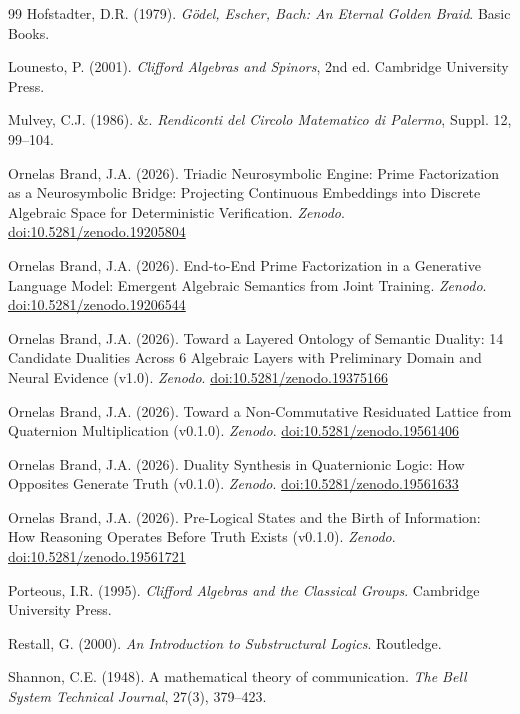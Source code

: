 \documentclass[11pt,a4paper]{article}
\begin{document}
\begin{thebibliography}{99}
Hofstadter, D.R. (1979).
\textit{G\"odel, Escher, Bach: An Eternal Golden Braid}.
Basic Books.

Lounesto, P. (2001).
\textit{Clifford Algebras and Spinors}, 2nd ed.
Cambridge University Press.

Mulvey, C.J. (1986).
\&.
\textit{Rendiconti del Circolo Matematico di Palermo}, Suppl. 12,
99--104.

Ornelas Brand, J.A. (2026).
Triadic Neurosymbolic Engine: Prime Factorization as a Neurosymbolic
Bridge: Projecting Continuous Embeddings into Discrete Algebraic Space
for Deterministic Verification.
\textit{Zenodo}.
\href{https://doi.org/10.5281/zenodo.19205804}{doi:10.5281/zenodo.19205804}

Ornelas Brand, J.A. (2026).
End-to-End Prime Factorization in a Generative Language Model:
Emergent Algebraic Semantics from Joint Training.
\textit{Zenodo}.
\href{https://doi.org/10.5281/zenodo.19206544}{doi:10.5281/zenodo.19206544}

Ornelas Brand, J.A. (2026).
Toward a Layered Ontology of Semantic Duality: 14 Candidate Dualities
Across 6 Algebraic Layers with Preliminary Domain and Neural Evidence
(v1.0).
\textit{Zenodo}.
\href{https://doi.org/10.5281/zenodo.19375166}{doi:10.5281/zenodo.19375166}

Ornelas Brand, J.A. (2026).
Toward a Non-Commutative Residuated Lattice from Quaternion
Multiplication (v0.1.0).
\textit{Zenodo}.
\href{https://doi.org/10.5281/zenodo.19561406}{doi:10.5281/zenodo.19561406}

Ornelas Brand, J.A. (2026).
Duality Synthesis in Quaternionic Logic: How Opposites Generate Truth (v0.1.0).
\textit{Zenodo}.
\href{https://doi.org/10.5281/zenodo.19561633}{doi:10.5281/zenodo.19561633}

Ornelas Brand, J.A. (2026).
Pre-Logical States and the Birth of Information: How Reasoning
Operates Before Truth Exists (v0.1.0).
\textit{Zenodo}.
\href{https://doi.org/10.5281/zenodo.19561721}{doi:10.5281/zenodo.19561721}

Porteous, I.R. (1995).
\textit{Clifford Algebras and the Classical Groups}.
Cambridge University Press.

Restall, G. (2000).
\textit{An Introduction to Substructural Logics}.
Routledge.

Shannon, C.E. (1948).
A mathematical theory of communication.
\textit{The Bell System Technical Journal}, 27(3), 379--423.

\end{thebibliography}
\end{document}
